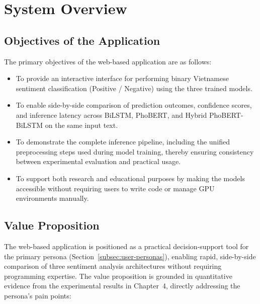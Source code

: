 \documentclass[12pt]{report} %
\begin{document}
\section{System Overview}

\subsection{Objectives of the Application}

The primary objectives of the web-based application are as follows:
\begin{itemize}
    \item To provide an interactive interface for performing binary Vietnamese sentiment classification (Positive / Negative) using the three trained models.
    \item To enable side-by-side comparison of prediction outcomes, confidence scores, and inference latency across BiLSTM, PhoBERT, and Hybrid PhoBERT-BiLSTM on the same input text.
    \item To demonstrate the complete inference pipeline, including the unified preprocessing steps used during model training, thereby ensuring consistency between experimental evaluation and practical usage.
    \item To support both research and educational purposes by making the models accessible without requiring users to write code or manage GPU environments manually.
\end{itemize}

\subsection{Value Proposition}
\label{subsec:value-proposition}

The web-based application is positioned as a practical decision-support tool for the primary persona (Section~\ref{subsec:user-personas}), enabling rapid, side-by-side comparison of three sentiment analysis architectures without requiring programming expertise. The value proposition is grounded in quantitative evidence from the experimental results in Chapter~4, directly addressing the persona's pain points:
\end{document}
